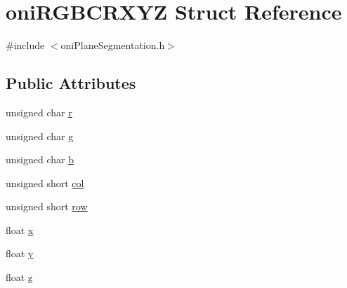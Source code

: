 \hypertarget{structoni_r_g_b_c_r_x_y_z}{\section{oni\-R\-G\-B\-C\-R\-X\-Y\-Z Struct Reference}
\label{structoni_r_g_b_c_r_x_y_z}
}


{\ttfamily \#include $<$oni\-Plane\-Segmentation.\-h$>$}

\subsection*{Public Attributes}
\begin{DoxyCompactItemize}
\item 
unsigned char \hyperlink{structoni_r_g_b_c_r_x_y_z_ab548d9d2d77446ba839124630eba4cd1}{r}
\item 
unsigned char \hyperlink{structoni_r_g_b_c_r_x_y_z_ad205110931dbbf0fda04e3b0ad2e26bd}{g}
\item 
unsigned char \hyperlink{structoni_r_g_b_c_r_x_y_z_a5441379b45133c8d2db7dc4d7e04a1bb}{b}
\item 
unsigned short \hyperlink{structoni_r_g_b_c_r_x_y_z_a66042f0ffba0616df5098f0ae276ed57}{col}
\item 
unsigned short \hyperlink{structoni_r_g_b_c_r_x_y_z_aaee0318f6df1fcc2e70f641d1f603d90}{row}
\item 
float \hyperlink{structoni_r_g_b_c_r_x_y_z_a5cb3b825ea9f2744df1dbc90af7f8d26}{x}
\item 
float \hyperlink{structoni_r_g_b_c_r_x_y_z_a7359bd5770d4685c717c634451b33337}{y}
\item 
float \hyperlink{structoni_r_g_b_c_r_x_y_z_aa4745113704723d9220f40f77d67df5c}{z}
\end{DoxyCompactItemize}


